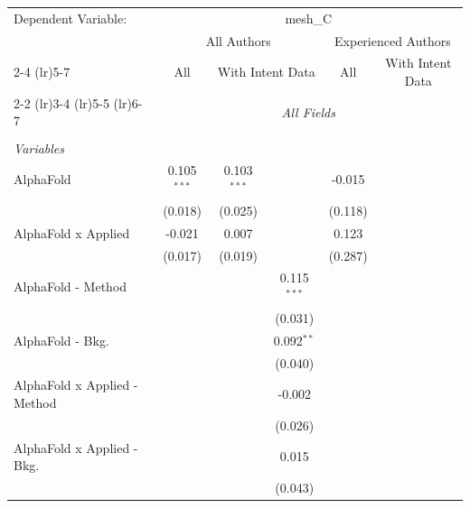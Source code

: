 \begingroup
\centering
\begin{tabular}{lcccccc}
   \tabularnewline \midrule \midrule
   Dependent Variable: & \multicolumn{6}{c}{mesh\_C}\\
 & \multicolumn{3}{c}{All Authors} & \multicolumn{3}{c}{Experienced Authors} \\
\cmidrule(lr){2-4} \cmidrule(lr){5-7}
 & \multicolumn{1}{c}{All} & \multicolumn{2}{c}{With Intent Data} & \multicolumn{1}{c}{All} & \multicolumn{2}{c}{With Intent Data} \\
\cmidrule(lr){2-2} \cmidrule(lr){3-4} \cmidrule(lr){5-5} \cmidrule(lr){6-7}
 & \multicolumn{6}{c}{\textit{All Fields}} \\ \\
   \emph{Variables}\\
   AlphaFold                      & 0.105$^{***}$ & 0.103$^{***}$ &               & -0.015        &        &   \\   
                                  & (0.018)       & (0.025)       &               & (0.118)       &        &   \\   
   AlphaFold x Applied            & -0.021        & 0.007         &               & 0.123         &        &   \\   
                                  & (0.017)       & (0.019)       &               & (0.287)       &        &   \\   
   AlphaFold - Method             &               &               & 0.115$^{***}$ &               &        &   \\   
                                  &               &               & (0.031)       &               &        &   \\   
   AlphaFold - Bkg.               &               &               & 0.092$^{**}$  &               &        &   \\   
                                  &               &               & (0.040)       &               &        &   \\   
   AlphaFold x Applied - Method   &               &               & -0.002        &               &        &   \\   
                                  &               &               & (0.026)       &               &        &   \\   
   AlphaFold x Applied - Bkg.     &               &               & 0.015         &               &        &   \\   
                                  &               &               & (0.043)       &               &        &   \\   

\end{tabular}
